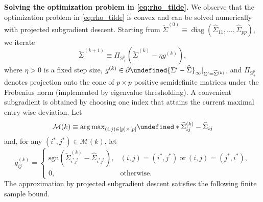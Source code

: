 \documentclass[10pt,a4paper]{amsart}
\theoremstyle{plain}
\theoremstyle{remark}
\newcommand{\diag}{\operatorname{diag}}
\def\hat#1{\widehat{#1}}
\def\tilde#1{\widetilde{#1}}
\let\norm\undefined %
\DeclarePairedDelimiter\norm{\lVert}{\rVert}
\begin{document}
\setcounter{equation}{13}
\medskip
\textbf{Solving the optimization problem in \cref{eq:rho_tilde}. }
% 
We observe that the optimization problem in \cref{eq:rho_tilde} is convex and can be solved numerically with projected subgradient descent. Starting from $\tilde\Sigma^{(0)} \equiv \diag(\hat\Sigma_{11}, \dots, \hat\Sigma_{pp})$, we iterate
\begin{equation} \label{eq:psg_update}
    \tilde\Sigma^{(k+1)} \equiv \Pi_{\mathbb{S}_{+}^p}(\tilde\Sigma^{(k)} - \eta g^{(k)}),
\end{equation}
where $\eta > 0$ is a fixed step size, $g^{(k)} \in \partial\norm{\Sigma' - \hat\Sigma}_\infty |_{\Sigma' = \tilde\Sigma^{(k)}}$, and $\Pi_{\mathbb{S}_{+}^p}$ denotes projection onto the cone of $p \times p$ positive semidefinite matrices under the Frobenius norm (implemented by eigenvalue thresholding).  A convenient subgradient is obtained by choosing one index that attains the current maximal entry-wise deviation.  Let  
\begin{equation*}
    \mathcal{M}(k)
    \equiv {\arg\max}_{(i,j) \in [p] \times [p]} \norm*{\tilde\Sigma^{(k)}_{ij}-\hat\Sigma_{ij}}
\end{equation*}
and, for any $(i^*,j^*) \in \mathcal M(k)$, let
\begin{equation} \label{eq:subgradient}
    g^{(k)}_{ij}
    = \begin{cases}
      \mathrm{sgn}(\tilde\Sigma^{(k)}_{i^*j^*} - \hat\Sigma_{i^*j^*}),
      & (i,j)=(i^*,j^*) ~\text{or}~ (i,j)=(j^*,i^*),\\
      0, & \text{otherwise}.
    \end{cases}
\end{equation}
The approximation by projected subgradient descent satisfies the following finite sample bound. 
\end{document}
